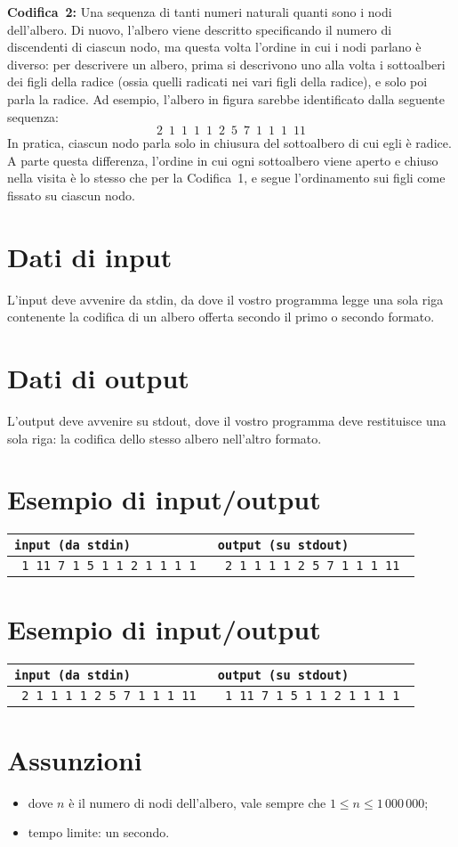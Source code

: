 \documentclass[a4paper,11pt]{article}
\newcommand{\file}[1]{\texttt{#1}}
\newcommand{\esempio}[2]{
\noindent\begin{minipage}{\textwidth}
\begin{tabular}{|p{8cm}|p{8cm}|}
	\hline
      \textbf{\file{input (da stdin)}} & \textbf{\file{output (su stdout)}}\\
	\hline
	\tt \small #1 &
	\tt \small #2 \\
	\hline
\end{tabular}
\end{minipage}
}
\begin{document}
\noindent
{\bf Codifica~2:}
Una sequenza di tanti numeri naturali quanti sono i nodi dell'albero. 
Di nuovo, l'albero viene descritto specificando il numero di discendenti di ciascun nodo, ma questa volta l'ordine in cui i nodi parlano è diverso:
per descrivere un albero, prima si descrivono uno alla volta i sottoalberi dei figli della radice (ossia quelli radicati nei vari figli della radice), e solo poi parla la radice.
Ad esempio, l'albero in figura sarebbe identificato dalla seguente sequenza:
\[
2\,\,\,1\,\,\,1\,\,\,1\,\,\,1\,\,\,2\,\,\,5\,\,\,7\,\,\,1\,\,\,1\,\,\,1\,\,\,11
\]	
In pratica, ciascun nodo parla solo in chiusura del sottoalbero di cui egli è radice.
A parte questa differenza, l'ordine in cui ogni sottoalbero viene aperto e chiuso nella visita è lo stesso che per la Codifica~1, e segue l'ordinamento sui figli come fissato su ciascun nodo. 


\section*{Dati di input}

L'input deve avvenire da stdin, da dove il vostro programma legge una sola riga contenente la codifica di un albero offerta secondo il primo o secondo formato.

\section*{Dati di output}

L'output deve avvenire su stdout, dove il vostro programma deve restituisce una sola riga: la codifica dello stesso albero nell'altro formato.

\section*{Esempio di input/output}
\esempio{
1 11 7 1 5 1 1 2 1 1 1 1
}{
2 1 1 1 1 2 5 7 1 1 1 11
}


\section*{Esempio di input/output}
\esempio{
2 1 1 1 1 2 5 7 1 1 1 11
}{
1 11 7 1 5 1 1 2 1 1 1 1
}

\section*{Assunzioni}
\begin{itemize}[nolistsep, noitemsep]
\item dove $n$ \`e il numero di nodi dell'albero,
      vale sempre che $1 \le n \le 1\,000\,000 $;
\item tempo limite: un secondo.
\end{itemize}
\end{document}
